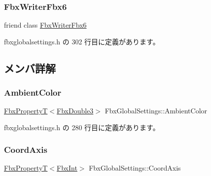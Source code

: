 \subsubsection{\texorpdfstring{Fbx\+Writer\+Fbx6}{FbxWriterFbx6}}
{\footnotesize\ttfamily friend class \hyperlink{class_fbx_writer_fbx6}{Fbx\+Writer\+Fbx6}\hspace{0.3cm}{\ttfamily [friend]}}



 fbxglobalsettings.\+h の 302 行目に定義があります。



\subsection{メンバ詳解}
\mbox{\label{class_fbx_global_settings_ae88d400ce323626f0293c03531c79975}} 
\subsubsection{\texorpdfstring{Ambient\+Color}{AmbientColor}}
{\footnotesize\ttfamily \hyperlink{class_fbx_property_t}{Fbx\+PropertyT}$<$\hyperlink{fbxtypes_8h_ae0a96f14cde566774c7553aa7523b7a7}{Fbx\+Double3}$>$ Fbx\+Global\+Settings\+::\+Ambient\+Color\hspace{0.3cm}{\ttfamily [protected]}}



 fbxglobalsettings.\+h の 280 行目に定義があります。

\mbox{\label{class_fbx_global_settings_abd52fb7c521c43e362cb8e4da34c016d}} 
\subsubsection{\texorpdfstring{Coord\+Axis}{CoordAxis}}
{\footnotesize\ttfamily \hyperlink{class_fbx_property_t}{Fbx\+PropertyT}$<$\hyperlink{fbxtypes_8h_a088fa96de3b0b3ea69f0f6afef525dfb}{Fbx\+Int}$>$ Fbx\+Global\+Settings\+::\+Coord\+Axis\hspace{0.3cm}{\ttfamily [protected]}}



